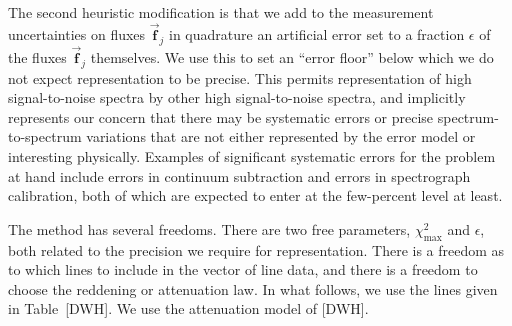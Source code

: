 \documentclass[12pt,letterpaper]{article}
\newcommand{\chisqmax}{\chi^2_{\mathrm{max}}}
\newcommand{\datavec}[1]{\vec{\boldsymbol{#1}}}
\newcommand{\vfj}{\datavec{f}_{\!j}}
\begin{document}
The second heuristic modification is that we add to the measurement
uncertainties on fluxes $\vfj$ in quadrature an artificial error set
to a fraction $\epsilon$ of the fluxes $\vfj$ themselves.  We use this
to set an ``error floor'' below which we do not expect representation
to be precise.  This permits representation of high signal-to-noise
spectra by other high signal-to-noise spectra, and implicitly
represents our concern that there may be systematic errors or precise
spectrum-to-spectrum variations that are not either represented by the
error model or interesting physically.  Examples of significant
systematic errors for the problem at hand include errors in continuum
subtraction and errors in spectrograph calibration, both of which are
expected to enter at the few-percent level at least.

The method has several freedoms.  There are two free parameters,
$\chisqmax$ and $\epsilon$, both related to the precision we require
for representation.  There is a freedom as to which lines to include
in the vector of line data, and there is a freedom to choose the
reddening or attenuation law.  In what follows, we use the lines given
in Table~[DWH].  We use the attenuation model of [DWH].
\end{document}
